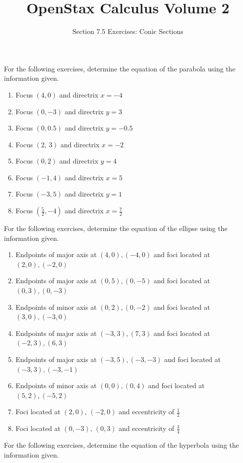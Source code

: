 \documentclass{exercises}
\title{OpenStax Calculus Volume 2}
\subtitle{Section 7.5 Exercises: Conic Sections}
\author{}
\date{}
\begin{document}
\maketitle


For the following exercises, determine the equation of the parabola using the information given.

\begin{enumerate}[start=1]
\item Focus $(4,0)$ and directrix $x=-4$
\item Focus $(0,-3)$ and directrix $y=3$
\item Focus $(0,0.5)$ and directrix $y=-0.5$
\item Focus $(2,\,3)$ and directrix $x=-2$
\item Focus $(0,2)$ and directrix $y=4$
\item Focus $(-1,4)$ and directrix $x=5$
\item Focus $(-3,5)$ and directrix $y=1$
\item Focus $(\frac{5}{2},-4)$ and directrix $x=\frac{7}{2}$
\end{enumerate}

For the following exercises, determine the equation of the ellipse using the information given.

\begin{enumerate}[resume]
\item Endpoints of major axis at $(4,0),(-4,0)$ and foci located at $(2,0),(-2,0)$
\item Endpoints of major axis at $(0,5),(0,-5)$ and foci located at $(0,3),(0,-3)$
\item Endpoints of minor axis at $(0,2),(0,-2)$ and foci located at $(3,0),(-3,0)$
\item Endpoints of major axis at $(-3,3),(7,3)$ and foci located at $(-2,3),(6,3)$
\item Endpoints of major axis at $(-3,5),(-3,-3)$ and foci located at $(-3,3),(-3,-1)$
\item Endpoints of minor axis at $(0,0),(0,4)$ and foci located at $(5,2),(-5,2)$
\item Foci located at $(2,0),\,(-2,0)$ and eccentricity of $\frac{1}{2}$
\item Foci located at $(0,-3),\,(0,3)$ and eccentricity of $\frac{3}{4}$
\end{enumerate}

For the following exercises, determine the equation of the hyperbola using the information given.
\end{document}
